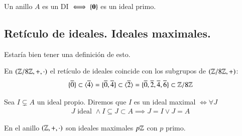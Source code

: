 \begin{pro}
	Un anillo $A$ es un DI $\iff \{\mathbf{0}\}$ es un ideal primo.
\end{pro}

\subsection{Retículo de ideales. Ideales maximales.}

\begin{dfn}
	Estaría bien tener una definición de esto.
\end{dfn}


\begin{ej}
	En $(\mathbb{Z}/8\mathbb{Z}, +, \cdot)$ el retículo de ideales coincide con los subgrupos de $(\mathbb{Z}/8\mathbb{Z}, +)$:
	\begin{align*}
		\{\overline{0}\} \subset \langle\overline{4}\rangle = \{\overline{0}, \overline{4}\} \subset \langle\overline{2}\rangle = \{\overline{0}, \overline{2}, \overline{4}, \overline{6}\} \subset \mathbb{Z}/8\mathbb{Z}
	\end{align*}
\end{ej}

\begin{dfn}
	Sea $I \subsetneq A$ un ideal propio. Diremos que $I$ es un ideal maximal $\iff \forall J$
	\begin{align*}
		J \text{ ideal } \land I \subseteq J \subset A \implies J = I \lor J = A
	\end{align*}
\end{dfn}

\begin{pro}
	En el anillo $(\mathbb{Z}, +, \cdot)$ son ideales maximales $p\mathbb{Z}$ con $p$ primo.
\end{pro}

